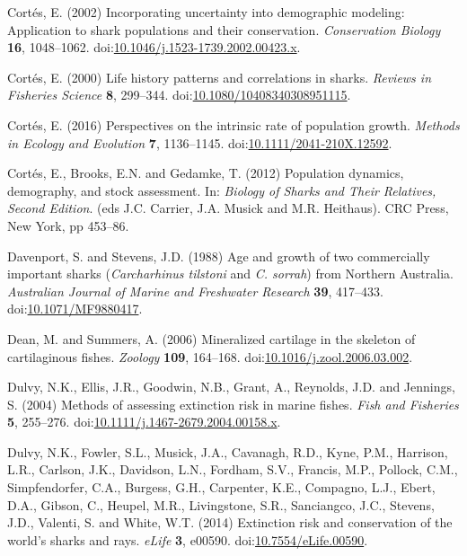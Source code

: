\documentclass[]{article}
\begin{document}
\hypertarget{ref-cortes_incorporating_2002}{}
Cortés, E. (2002) Incorporating uncertainty into demographic modeling:
Application to shark populations and their conservation.
\emph{Conservation Biology} \textbf{16}, 1048--1062.
doi:\href{https://doi.org/10.1046/j.1523-1739.2002.00423.x}{10.1046/j.1523-1739.2002.00423.x}.

\hypertarget{ref-cortes_life_2000}{}
Cortés, E. (2000) Life history patterns and correlations in sharks.
\emph{Reviews in Fisheries Science} \textbf{8}, 299--344.
doi:\href{https://doi.org/10.1080/10408340308951115}{10.1080/10408340308951115}.

\hypertarget{ref-cortes_perspectives_2016}{}
Cortés, E. (2016) Perspectives on the intrinsic rate of population
growth. \emph{Methods in Ecology and Evolution} \textbf{7}, 1136--1145.
doi:\href{https://doi.org/10.1111/2041-210X.12592}{10.1111/2041-210X.12592}.

\hypertarget{ref-cortes_population_2012}{}
Cortés, E., Brooks, E.N. and Gedamke, T. (2012) Population dynamics,
demography, and stock assessment. In: \emph{Biology of Sharks and Their
Relatives, Second Edition}. (eds J.C. Carrier, J.A. Musick and M.R.
Heithaus). CRC Press, New York, pp 453--86.

\hypertarget{ref-davenport_age_1988}{}
Davenport, S. and Stevens, J.D. (1988) Age and growth of two
commercially important sharks (\emph{Carcharhinus tilstoni} and \emph{C.
sorrah}) from Northern Australia. \emph{Australian Journal of Marine and
Freshwater Research} \textbf{39}, 417--433.
doi:\href{https://doi.org/10.1071/MF9880417}{10.1071/MF9880417}.

\hypertarget{ref-dean_mineralized_2006}{}
Dean, M. and Summers, A. (2006) Mineralized cartilage in the skeleton of
cartilaginous fishes. \emph{Zoology} \textbf{109}, 164--168.
doi:\href{https://doi.org/10.1016/j.zool.2006.03.002}{10.1016/j.zool.2006.03.002}.

\hypertarget{ref-dulvy_methods_2004}{}
Dulvy, N.K., Ellis, J.R., Goodwin, N.B., Grant, A., Reynolds, J.D. and
Jennings, S. (2004) Methods of assessing extinction risk in marine
fishes. \emph{Fish and Fisheries} \textbf{5}, 255--276.
doi:\href{https://doi.org/10.1111/j.1467-2679.2004.00158.x}{10.1111/j.1467-2679.2004.00158.x}.

\hypertarget{ref-dulvy_extinction_2014}{}
Dulvy, N.K., Fowler, S.L., Musick, J.A., Cavanagh, R.D., Kyne, P.M.,
Harrison, L.R., Carlson, J.K., Davidson, L.N., Fordham, S.V., Francis,
M.P., Pollock, C.M., Simpfendorfer, C.A., Burgess, G.H., Carpenter,
K.E., Compagno, L.J., Ebert, D.A., Gibson, C., Heupel, M.R.,
Livingstone, S.R., Sanciangco, J.C., Stevens, J.D., Valenti, S. and
White, W.T. (2014) Extinction risk and conservation of the world's
sharks and rays. \emph{eLife} \textbf{3}, e00590.
doi:\href{https://doi.org/10.7554/eLife.00590}{10.7554/eLife.00590}.
\end{document}
